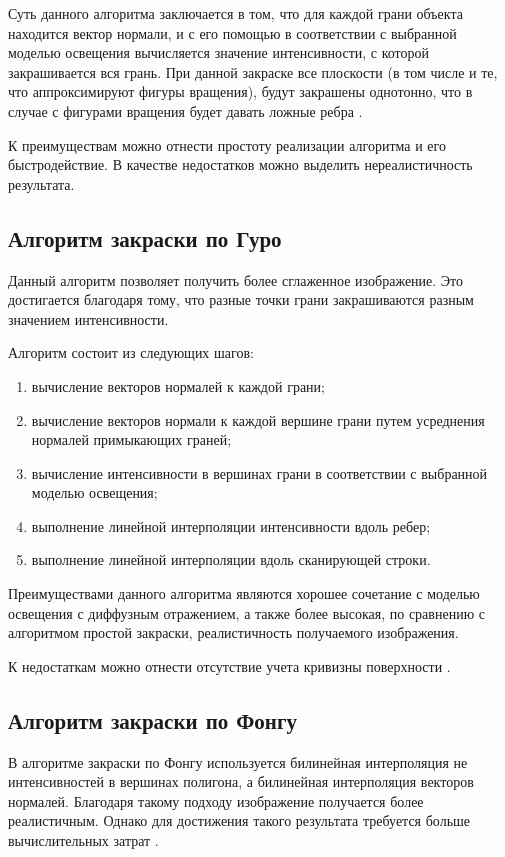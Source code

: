 Суть данного алгоритма заключается в том, что для каждой грани объекта
находится вектор нормали, и с его помощью в соответствии с выбранной
моделью освещения вычисляется значение интенсивности, с которой
закрашивается вся грань.
При данной закраске все плоскости (в том числе и те, что аппроксимируют
фигуры вращения), будут закрашены однотонно, что в случае с фигурами
вращения будет давать ложные ребра \cite{info_rodjers}.

К преимуществам можно отнести простоту реализации алгоритма и его быстродействие. 
В качестве недостатков можно выделить нереалистичность результата.

\subsection{Алгоритм закраски по Гуро}

Данный алгоритм позволяет получить более сглаженное изображение. 
Это достигается благодаря тому, что разные точки грани закрашиваются разным
значением интенсивности.

Алгоритм состоит из следующих шагов:

\begin{enumerate}[label={\arabic*)}]
	\item вычисление векторов нормалей к каждой грани;
	\item вычисление векторов нормали к каждой вершине грани путем усреднения нормалей примыкающих граней;
	\item вычисление интенсивности в вершинах грани в соответствии с выбранной моделью освещения;
	\item выполнение линейной интерполяции интенсивности вдоль ребер;
	\item выполнение линейной интерполяции вдоль сканирующей строки.
\end{enumerate}

Преимуществами данного алгоритма являются хорошее сочетание с моделью освещения с диффузным отражением, а также более высокая, по сравнению с алгоритмом простой закраски, реалистичность получаемого изображения.

К недостаткам можно отнести отсутствие учета кривизны поверхности \cite{info_rodjers}.

\subsection{Алгоритм закраски по Фонгу}

В алгоритме закраски по Фонгу используется билинейная интерполяция не интенсивностей в вершинах полигона, а билинейная интерполяция векторов нормалей. 
Благодаря такому подходу изображение получается более реалистичным. 
Однако для достижения такого результата требуется больше вычислительных затрат \cite{info_rodjers}.

